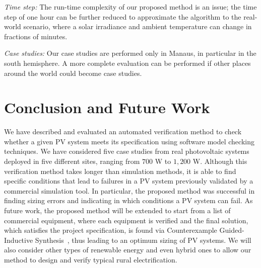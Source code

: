 \documentclass[journal]{IEEEtran}
\begin{document}
\textit{Time step:} The run-time complexity of our proposed method is an issue; the time step of one hour can be further reduced to approximate the algorithm to the real-world scenario, where a solar irradiance and ambient temperature can change in fractions of minutes.

\textit{Case studies:} Our case studies are performed only in Manaus, in particular in the south hemisphere. A more complete evaluation can be performed if other places around the world could become case studies.

\section{Conclusion and Future Work}
\label{sec:Conclusions}

We have described and evaluated an automated verification method to check whether a given PV system meets its specification using software model checking techniques. We have considered five case studies from real photovoltaic systems deployed in five different sites, ranging from $700$ W to $1,200$ W. Although this verification method takes longer than simulation methods, it is able to find specific conditions that lead to failures in a PV system previously validated by a commercial simulation tool. In particular, the proposed method was successful in finding sizing errors and indicating in which conditions a PV system can fail. 
As future work, the proposed method will be extended to start from a list of commercial equipment, where each equipment is verified and the final solution, which satisfies the project specification, is found via Counterexample Guided-Inductive Synthesis~\cite{DBLP:conf/asplos/Solar-LezamaTBSS06}, thus leading to an optimum sizing of PV systems. We will also consider other types of renewable energy and even hybrid ones to allow our method to design and verify typical rural electrification.
%
\end{document}

